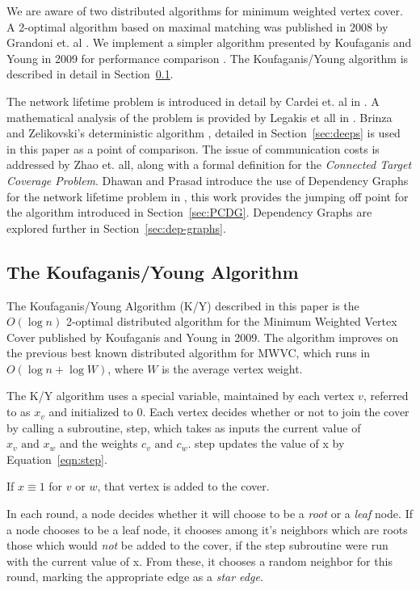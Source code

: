 \documentclass[technote, 10pt, letter]{IEEEtran}
\begin{document}
We are aware of two distributed algorithms for minimum weighted vertex cover. A 2-optimal algorithm based on maximal matching was published in 2008 by Grandoni et. al \cite{1435381}. We implement a simpler algorithm presented by Koufaganis and Young in 2009 for performance comparison \cite{1582746}. The Koufaganis/Young algorithm is described in detail in Section~\ref{sec:k-y-alg}.

The network lifetime problem is introduced in detail by Cardei et. al in \cite{1498475}. A mathematical analysis of the problem is provided by Legakis et all in \cite{4697802}. Brinza and Zelikovski's deterministic algorithm \cite{1640702}, detailed in Section~\ref{sec:deeps} is used in this paper as a point of comparison. The issue of communication costs is addressed by Zhao et. all, along with a formal definition for the {\em Connected Target Coverage Problem}\cite{1514028}. Dhawan and Prasad introduce the use of Dependency Graphs for the network lifetime problem in \cite{978-3-540-77220-0_36}, this work provides the jumping off point for the algorithm introduced in Section~\ref{sec:PCDG}. Dependency Graphs are explored further in Section~\ref{sec:dep-graphs}.

\subsection{The Koufaganis/Young Algorithm}
\label{sec:k-y-alg}

The Koufaganis/Young Algorithm (K/Y) described in this paper is the $O(\log n)$ 2-optimal distributed algorithm for the Minimum Weighted Vertex Cover published by Koufaganis and Young in 2009\cite{1582746}. The algorithm improves on the previous best known distributed algorithm for MWVC, which runs in $O(\log n + \log W)$, where  $W$ is the average vertex weight\cite{1435381}.

The K/Y algorithm uses a special variable, maintained by each vertex $v$, referred to as $x_v$ and initialized to 0. Each vertex decides whether or not to join the cover by calling a subroutine, {\ttfamily step}, which takes as inputs the current value of $x_v \text{ and } x_w$ and the weights $c_v \text{ and } c_w$. {\ttfamily step} updates the value of x by Equation~\ref{eqn:step}.



If $x \equiv 1 $ for $v \text{ or } w$, that vertex is added to the cover.

In each round, a node decides whether it will choose to be a {\em root} or a {\em leaf} node. If a node chooses to be a leaf node, it chooses among it's neighbors which are roots those which would {\em not} be added to the cover, if the {\ttfamily step} subroutine were run with the current value of x. From these, it chooses a random neighbor for this round, marking the appropriate edge as a {\em star edge}.
\end{document}
